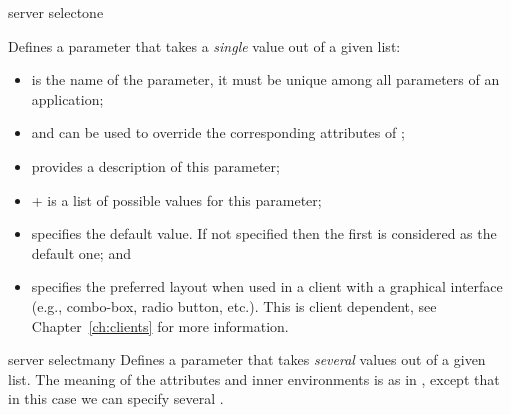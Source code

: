 \bigskip
\xmlstruct
{server}
{selectone}
{%
%
  Defines a parameter that takes a \emph{single} value out of a given
  list:

  \begin{itemize}
  \item {} is the name of the parameter, it must be
    unique among all parameters of an application;

  \item {} and  can be used
    to override the corresponding attributes of
    ;

  \item {} provides a description of this parameter;

  \item {}+ is a list of possible values for
    this parameter;

  \item {} specifies the default value. If
    not specified then the first  is considered
    as the default one; and

  \item {} specifies the preferred layout when
    used in a client with a graphical interface (e.g., combo-box,
    radio button, etc.). This is client dependent, see
    Chapter~\ref{ch:clients} for more information.

  \end{itemize}
%
}


\bigskip
\xmlstruct
{server}
{selectmany}
{%
%
  Defines a parameter that takes \emph{several} values out of a given
  list. The meaning of the attributes and inner environments is as in
  , except that in this case we can specify
  several  .
%
}


